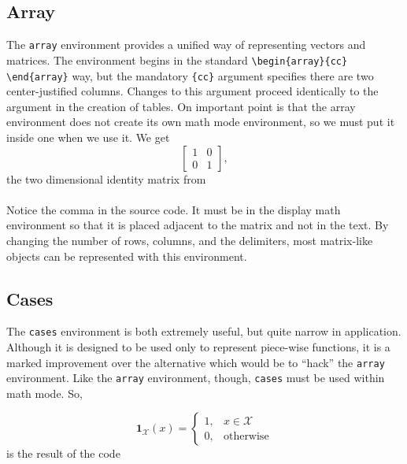 \subsection*{Array}
The \texttt{array} environment provides a unified way of representing
vectors and matrices. The environment begins in the standard
\verb!\begin{array}{cc} \end{array}! way, but the mandatory
\verb!{cc}! argument specifies there are two center-justified
columns. Changes to this argument proceed identically to the argument
in the creation of tables. On important point is that the array
environment does not create its own math mode environment, so we must
put it inside one when we use it. We get \[ \left[\begin{array}{cc} 1 & 0 \\
    0 & 1\end{array}\right], \] the two dimensional identity matrix
from \\
\ovalbox{
    \begin{minipage}{\linewidth}
\begin{verbatim}
\[
 \left[
\begin{array}{cc}
  1 & 0 \\
  0 & 1
\end{array}
\right],
\]
\end{verbatim}
    \end{minipage}
  } \\ Notice the comma in the source code. It must be in the display
  math environment so that it is placed adjacent to the matrix and not
  in the text. By changing the number of rows, columns, and the
  delimiters, most matrix-like objects can be represented with this
  environment.

\subsection*{Cases}

The \texttt{cases} environment is both extremely useful, but quite
narrow in application. Although it is designed to be used only to
represent piece-wise functions, it is a marked improvement over the
alternative which would be to ``hack'' the \texttt{array}
environment. Like the \texttt{array} environment, though,
\texttt{cases} must be used within math mode. So,

\[
\mathbf{1}_{\mathcal{X}}(x) =
\begin{cases}
  1, & x \in \mathcal{X} \\
  0, & \textrm{otherwise}
\end{cases}
\]
is the result of the code

